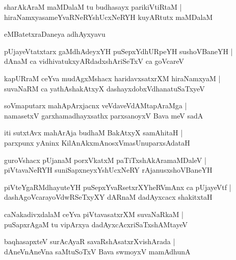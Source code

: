 \documentclass[twoside,12pt,openright]{book}
\newcounter{shloka}[chapter]
\begin{document}
\begin{shloka}%
sharAkAraM maMDalaM tu budhasayx parikiVtiRtaM |\\
hiraNamxyasameYvaRNeRYshUcxNeRYH kuyARtutx maMDalaM 
\end{shloka}

\begin{center}
eMBatetxraDaneya adhAyxyavu
\end{center}

\begin{shloka}%
pUjayeVtatxtarx gaMdhAdeyxYH puSepxYdhURpeYH sushoVBaneYH |\\
dAnaM ca vidhivatukxyARdadxshAriSeTxV ca goVcareV 
\end{shloka}

\begin{shloka}%
kapURraM ceYva mudAgxMshacx haridavxsatxrXM hiraNamxyaM |\\
suvaNaRM ca yathAshakAtxyX dashayxdobxVdhanatuSaTxyeV 
\end{shloka}

\begin{shloka}%
soVmaputarx mahApArxjacnx veVdaveVdAMtapAraMga |\\
namasetxV garxhamadhayxsathx parxsanoyxV Bava meV sadA 
\end{shloka}

\begin{shloka}%
iti sutxtAvx mahArAja budhaM BakAtxyX samAhitaH |\\
parxpunx yAninx KilAnAkxmAnosxVmasUnuparxsAdataH 
\end{shloka}

\begin{shloka}%
guroVshacx pUjanaM porxVkatxM paTiTxshAkAramaMDaleV |\\
piVtavaNeRYH suniSapxneyxYshUcxNeRY rAjanusxshoVBaneYH
\end{shloka}

\begin{shloka}%
piVteYgaRMdhayuteYH puSepxYvaRsetxrXYheRVmAnx ca pUjayeVtf |\\
dashAgoVcarayoVdwRSeTxyXY dARnaM dadAyxcacx shakitxtaH 
\end{shloka}

\begin{shloka}%
caNakadivxdalaM ceYva piVtavasatxrXM suvaNaRkaM |\\
puSapxrAgaM tu vipArxya dadAyxcAcxriSaTxshAMtayeV 
\end{shloka}

\begin{shloka}%
baqhasapxteV surAcAyaR savaRshAsatxrXvishArada |\\
dAneVnAneVna saMtuSoTxV Bava swmoyxV mamAdhunA 
\end{shloka}
\end{document}

